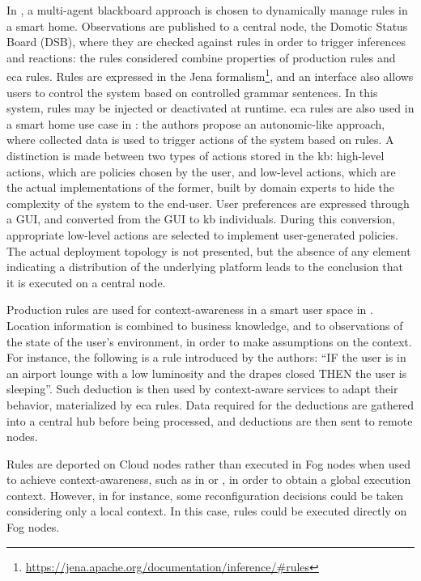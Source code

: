 \documentclass{iosart2c}
\begin{document}
In \cite{Kasnesis2015}, a multi-agent blackboard approach is chosen to dynamically manage rules in a smart home. 
Observations are published to a central node, the Domotic Status Board (DSB), where they are checked against rules in order to trigger inferences and reactions: the rules considered combine properties of production rules and \gls{eca} rules.
Rules are expressed in the Jena formalism\footnote{\url{https://jena.apache.org/documentation/inference/\#rules}}, and an interface also allows users to control the system based on controlled grammar sentences.
In this system, rules may be injected or deactivated at runtime.
\gls{eca} rules are also used in a smart home use case in \cite{Mainetti2015}: the authors propose an autonomic-like approach, where collected data is used to trigger actions of the system based on rules.
A distinction is made between two types of actions stored in the \gls{kb}: high-level actions, which are policies chosen by the user, and low-level actions, which are the actual implementations of the former, built by domain experts to hide the complexity of the system to the end-user.
User preferences are expressed through a GUI, and converted from the GUI to \gls{kb} individuals. 
During this conversion, appropriate low-level actions are selected to implement user-generated policies.
The actual deployment topology is not presented, but the absence of any element indicating a distribution of the underlying platform leads to the conclusion that it is executed on a central node.

Production rules are used for context-awareness in a smart user space in \cite{Hussein2016}.
Location information is combined to business knowledge, and to observations of the state of the user's environment, in order to make assumptions on the context.
For instance, the following is a rule introduced by the authors: ``IF the user is in an airport lounge with a low luminosity and the drapes closed THEN the user is sleeping''.
Such deduction is then used by context-aware services to adapt their behavior, materialized by \gls{eca} rules.
Data required for the deductions are gathered into a central hub before being processed, and deductions are then sent to remote nodes.

Rules are deported on Cloud nodes rather than executed in Fog nodes when used to achieve context-awareness, such as in \cite{Evchina2015} or \cite{Hussein2016}, in order to obtain a global execution context.
However, in \cite{Rodriguez2010} for instance, some reconfiguration decisions could be taken considering only a local context. 
In this case, rules could be executed directly on Fog nodes.
\end{document}
